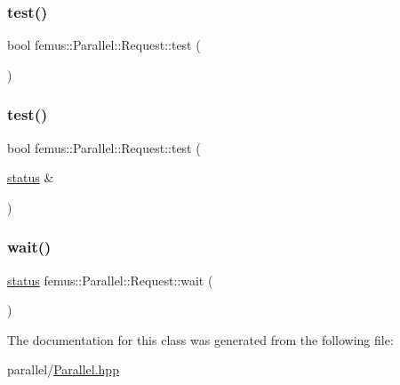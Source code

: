 \subsubsection{\texorpdfstring{test()}{test()}\hspace{0.1cm}{\footnotesize\ttfamily [1/2]}}
{\footnotesize\ttfamily bool femus\+::\+Parallel\+::\+Request\+::test (\begin{DoxyParamCaption}{ }\end{DoxyParamCaption})\hspace{0.3cm}{\ttfamily [inline]}}

\mbox{\label{classfemus_1_1_parallel_1_1_request_a15f1f5dfd71723f38a4d387cbd4dc24a}} 
\subsubsection{\texorpdfstring{test()}{test()}\hspace{0.1cm}{\footnotesize\ttfamily [2/2]}}
{\footnotesize\ttfamily bool femus\+::\+Parallel\+::\+Request\+::test (\begin{DoxyParamCaption}\item[{\mbox{\hyperlink{structfemus_1_1_parallel_1_1status}{status}} \&}]{ }\end{DoxyParamCaption})\hspace{0.3cm}{\ttfamily [inline]}}

\mbox{\label{classfemus_1_1_parallel_1_1_request_a6aa01007e11e607cc48a117a39cc04da}} 
\subsubsection{\texorpdfstring{wait()}{wait()}}
{\footnotesize\ttfamily \mbox{\hyperlink{structfemus_1_1_parallel_1_1status}{status}} femus\+::\+Parallel\+::\+Request\+::wait (\begin{DoxyParamCaption}{ }\end{DoxyParamCaption})\hspace{0.3cm}{\ttfamily [inline]}}



The documentation for this class was generated from the following file\+:\begin{DoxyCompactItemize}
\item 
parallel/\mbox{\hyperlink{_parallel_8hpp}{Parallel.\+hpp}}\end{DoxyCompactItemize}
